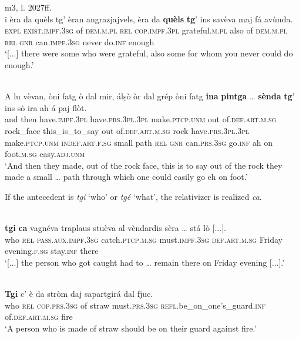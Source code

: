 \ea
\label{relpreppar2}
 {m3, l. 2027ff.}\\
	\gll [...] i èra da quèls tg’ èran angrazjajvels, èra da \textbf{quèls} \textbf{tg}’ ins savèva maj fá avùnda.\\
 {} \textsc{expl} \textsc{\textbf{}exist.impf.3sg} of \textsc{dem.m.pl} \textsc{rel} \textsc{cop.impf.3pl} grateful.\textsc{m.pl} also of \textsc{dem.m.pl} \textsc{rel} \textsc{gnr} can.\textsc{impf.3sg} never do.\textsc{inf} enough\\
\glt `[...] there were some who were grateful, also some for whom you never could do enough.'
\z

\ea
\label{relpreptras}
\\
\gll  A lu vèvan, òni fatg ò dal mir, álṣò òr dal grép òni fatg \textbf{ina} \textbf{pintga} …  \textbf{sènda} \textbf{tg}’ ins sò ira ah á paj flòt.\\
and then have.\textsc{impf.3pl} have.\textsc{prs.3pl.3pl} make.\textsc{ptcp.unm} out of.\textsc{def.art.m.sg} rock\_face this\_is\_to\_say out of.\textsc{def.art.m.sg} rock have.\textsc{prs.3pl.3pl} make.\textsc{ptcp.unm} \textsc{indef.art.f.sg} small {} path \textsc{rel} \textsc{gnr} can.\textsc{prs.3sg} go.\textsc{inf} ah on foot.\textsc{m.sg} easy.\textsc{adj.unm} \\
\glt `And then they made, out of the rock face, this is to say out of the rock they made a small … path through which one could easily go eh on foot.'
\z

If the antecedent is \textit{tgi} `who' or \textit{tgé} `what', the relativizer is realized \textit{ca}.

\ea
{}\\
\gll    [...] \textbf{tgi} \textbf{ca} vagnéva traplaus stuèva al vèndardis sèra … stá lò [...].\\
{}  who \textsc{rel} \textsc{pass.aux.impf.3sg} catch.\textsc{ptcp.m.sg} must.\textsc{impf.3sg} \textsc{def.art.m.sg} Friday evening.\textsc{f.sg} {} stay.\textsc{inf} there\\
\glt `[...] the person who got caught had to … remain there on Friday evening [...].'
\z

\ea
{}\\
\gll   \textbf{Tgi} {c}’ è da stròm daj sapartgirá dal fjuc.\\
     who \textsc{rel} \textsc{cop.prs.3sg} of straw must.\textsc{prs.3sg} \textsc{refl}.be\_on\_one’s\_guard.\textsc{inf} of.\textsc{def.art.m.sg} fire\\
\glt `A person who is made of straw should be on their guard against fire.'
\z

